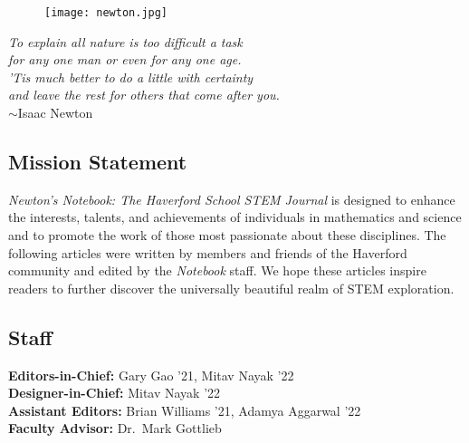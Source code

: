 \documentclass[12pt]{article}
\theoremstyle{definition}
\begin{document}
\setcounter{tocdepth}{1}



\begin{figure}[H]
    \centering \texttt{[image: newton.jpg]}
\end{figure}

\begin{center}
    \textit{To explain all nature is too difficult a task\\
    for any one man or even for any one age.\\
    'Tis much better to do a little with certainty\\
    and leave the rest for others that come after you.}\\
    	$\sim$Isaac Newton
\end{center}

\newpage
\begin{spacing}{1}
\tableofcontents
\end{spacing}


\newpage
\subsection*{Mission Statement}
\textit{Newton’s Notebook: The Haverford School STEM Journal} is designed to enhance the interests, talents, and achievements of individuals in mathematics and science and to promote the work of those most passionate about these disciplines. The following articles were written by members and friends of the Haverford community and edited by the \textit{Notebook} staff. We hope these articles inspire readers to further discover the universally beautiful realm of STEM exploration. 
\subsection*{Staff}
{\centering{}
    \textbf{Editors-in-Chief:} Gary Gao '21, Mitav Nayak '22
    \\
    \textbf{Designer-in-Chief:} Mitav Nayak '22
    \\ 
    \textbf{Assistant Editors:} Brian Williams '21, Adamya Aggarwal '22
    \\
    \textbf{Faculty Advisor:} Dr.\ Mark Gottlieb
    \\}
\end{document}
